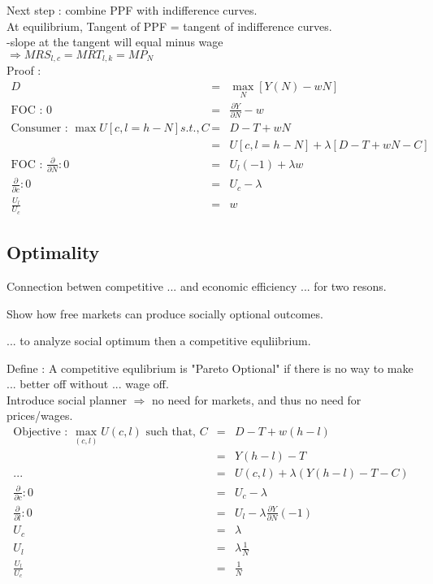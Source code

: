 Next step : combine PPF with indifference curves.\\

At equilibrium, Tangent of PPF = tangent of indifference curves.\\

-slope at the tangent will equal minus wage\\

$\Longrightarrow MRS_{l,c} = MRT_{l,k} = MP_N$\\

Proof : \\
\begin{eqnarray*}
D &=& \max_{N} \left[ Y(N) - wN\right]\\
\mbox{FOC : } 0 &=& \frac{\partial Y}{\partial N} - w\\
\mbox{Consumer : } \max U\left[ c, l=h-N \right] s.t., C &=& D - T + w N\\
&=& U\left[ c, l=h-N \right] + \lambda \left[ D - T + wN - C\right]\\
\mbox{FOC : } \frac{\partial}{\partial N} : 0 &=& U_l(-1) + \lambda w\\
\frac{\partial}{\partial c} : 0 &=& U_c - \lambda \\
\frac{U_l}{U_c} &=& w
\end{eqnarray*}

\subsection*{Optimality}
Connection betwen competitive ... and economic efficiency ... for two resons.\\
\begin{list}{-}{}
\item Show how free markets can produce socially optional outcomes.
\item ... to analyze social optimum then a competitive equliibrium.
\end{list}

Define : A competitive equlibrium is "Pareto Optional" if there is no way to make ... better off without ... wage off.\\

Introduce social planner $ \Rightarrow $ no need for markets, and thus no need for prices/wages.\\
\begin{eqnarray}
\mbox{Objective : } \max_{(c,l)} U(c,l) \mbox{ such that, } C &=& D-T +w(h-l)\nonumber\\
&=& Y(h-l)-T\nonumber\\
...&=&U(c,l) + \lambda (Y(h-l) - T - C)\nonumber\\
\frac{\partial}{\partial c} : 0 &=& U_c - \lambda\nonumber\\
\frac{\partial}{\partial l} : 0 &=& U_l - \lambda\frac{\partial Y}{\partial N} (-1)\nonumber\\
U_c &=& \lambda\nonumber\\
U_l &=& \lambda \frac{1}{N}\nonumber\\
\frac{U_l}{U_c} &=& \frac{1}{N}
\end{eqnarray}

